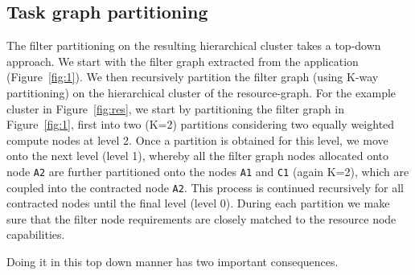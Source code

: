 

\subsection{Task graph partitioning}
\label{sec:filter-graph-part}

The filter partitioning on the resulting hierarchical cluster takes a
top-down approach. We start with the filter graph extracted from the
application (Figure~\ref{fig:1}). We then recursively partition the filter
graph (using K-way partitioning) on the hierarchical cluster of the
resource-graph. For the example cluster in Figure~\ref{fig:res}, we
start by partitioning the filter graph in Figure~\ref{fig:1}, first into
two (K=2) partitions considering two equally weighted compute nodes at
level 2. Once a partition is obtained for this level, we move onto the
next level (level 1), whereby all the filter graph nodes allocated onto
node \texttt{A2} are further partitioned onto the nodes \texttt{A1} and
\texttt{C1} (again K=2), which are coupled into the contracted node
\texttt{A2}. This process is continued recursively for all contracted
nodes until the final level (level 0). During each partition we make
sure that the filter node requirements are closely matched to the resource
node capabilities.


Doing it in this top down manner has two important consequences.

